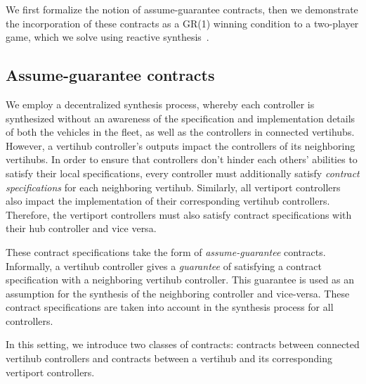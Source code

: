 We first formalize the notion of assume-guarantee contracts, then we demonstrate the incorporation of these contracts as a GR(1) winning condition to a two-player game, which we solve using reactive synthesis~\cite{Piterman06,bloem2012}. 

\subsection{Assume-guarantee contracts}

We employ a decentralized synthesis process, whereby each controller is synthesized without an awareness of the specification and implementation details of both the vehicles in the fleet, as well as the controllers in connected vertihubs.
However, a vertihub controller's outputs impact the controllers of its neighboring vertihubs. 
In order to ensure that controllers don't hinder each others' abilities to satisfy their local specifications, every controller must additionally satisfy \emph{contract specifications} for each neighboring vertihub.
Similarly, all vertiport controllers also impact the implementation of their corresponding vertihub controllers. Therefore, the vertiport controllers must also satisfy contract specifications with their hub controller and vice versa. 

 These contract specifications take the form of \emph{assume-guarantee} contracts. 
 Informally, a vertihub controller gives a \emph{guarantee} of satisfying a contract specification with a neighboring vertihub controller.
 This guarantee is used as an assumption for the synthesis of the neighboring controller and vice-versa.
 These contract specifications are taken into account in the synthesis process for all controllers. 


 
 In this setting, we introduce two classes of contracts: contracts between connected vertihub controllers and contracts between a vertihub and its corresponding vertiport controllers. 
 
